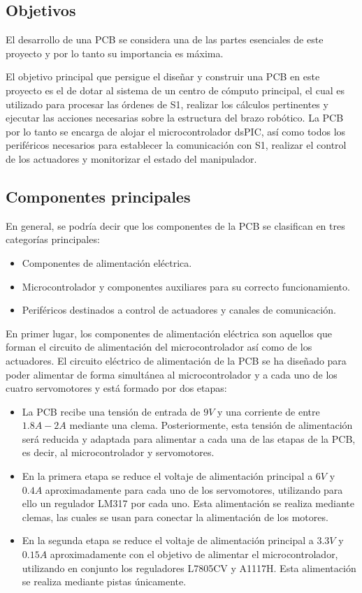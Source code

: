 \subsection{Objetivos}

El desarrollo de una \ac{PCB} se considera una de las partes esenciales de este proyecto y por lo tanto su importancia es máxima.

El objetivo principal que persigue el diseñar y construir una \ac{PCB} en este proyecto es el de dotar al sistema de un centro de cómputo principal, el cual es utilizado para procesar las órdenes de S1, realizar los cálculos pertinentes y ejecutar las acciones necesarias sobre la estructura del brazo robótico. La \ac{PCB} por lo tanto se encarga de alojar el microcontrolador dsPIC, así como todos los periféricos necesarios para establecer la comunicación con S1, realizar el control de los actuadores y monitorizar el estado del manipulador.

\subsection{Componentes principales}
\label{ssec:main_components}

En general, se podría decir que los componentes de la \ac{PCB} se clasifican en tres categorías principales:
\begin{itemize}
    \item Componentes de alimentación eléctrica.
    \item Microcontrolador y componentes auxiliares para su correcto funcionamiento.
    \item Periféricos destinados a control de actuadores y canales de comunicación.
\end{itemize}

En primer lugar, los componentes de alimentación eléctrica son aquellos que forman el circuito de alimentación del microcontrolador así como de los actuadores. El circuito eléctrico de alimentación de la \ac{PCB} se ha diseñado para poder alimentar de forma simultánea al microcontrolador y a cada uno de los cuatro servomotores y está formado por dos etapas:
\begin{itemize}
    \item La \ac{PCB} recibe una tensión de entrada de $9V$ y una corriente de entre $1.8A - 2A$ mediante una clema. Posteriormente, esta tensión de alimentación será reducida y adaptada para alimentar a cada una de las etapas de la \ac{PCB}, es decir, al microcontrolador y servomotores.
    \item En la primera etapa se reduce el voltaje de alimentación principal a $6V$ y $0.4A$ aproximadamente para cada uno de los servomotores, utilizando para ello un regulador LM317 por cada uno. Esta alimentación se realiza mediante clemas, las cuales se usan para conectar la alimentación de los motores.
    
    \item En la segunda etapa se reduce el voltaje de alimentación principal a $3.3V$ y $0.15A$ aproximadamente con el objetivo de alimentar el microcontrolador, utilizando en conjunto los reguladores L7805CV y A1117H. Esta alimentación se realiza mediante pistas únicamente.
\end{itemize}

